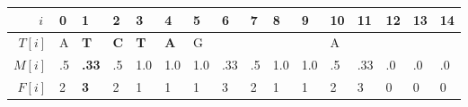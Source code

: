 \documentclass[20pt,border=5pt,convert={true}]{standalone}
\newcommand{\redBit}[1]{\begingroup\color{myclr1}\textbf{#1}\endgroup}
\begin{document}
\pagecolor[RGB]{255,255,255}%
\LARGE

\def\arraystretch{1.3}
\begin{tabular}{|r|C{10mm}|C{10mm}|C{10mm}|C{10mm}|C{10mm}|C{10mm}|C{10mm}|C{10mm}|C{10mm}|C{10mm}|C{10mm}|C{10mm}|C{10mm}|C{10mm}|C{10mm}|}
\hline
$i\phantom{]}$ & 0 & \redBit{1} & 2 & 3 & 4 & 5 & \redBit{6} & 7 & 8 & 9 & 10 & \redBit{11} & 12 & 13 & 14 \\
\hline
$T[i]$ & A & \redBit{T} & \redBit{C} & \redBit{T} & \redBit{A} & G &  &  &  &  & A &  &  &  &  \\
\hline
$M[i]$ & .5 & \redBit{.33} & .5 & 1.0 & 1.0 & 1.0 & .33 & .5 & 1.0 & 1.0 & .5 & .33 & .0 & .0 & .0 \\
\hline
$F[i]$ & 2 & \redBit{3} & 2 & 1 & 1 & 1 & 3 & 2 & 1 & 1 & 2 & 3 & 0 & 0 & 0 \\
\hline
\end{tabular}
\end{document}
